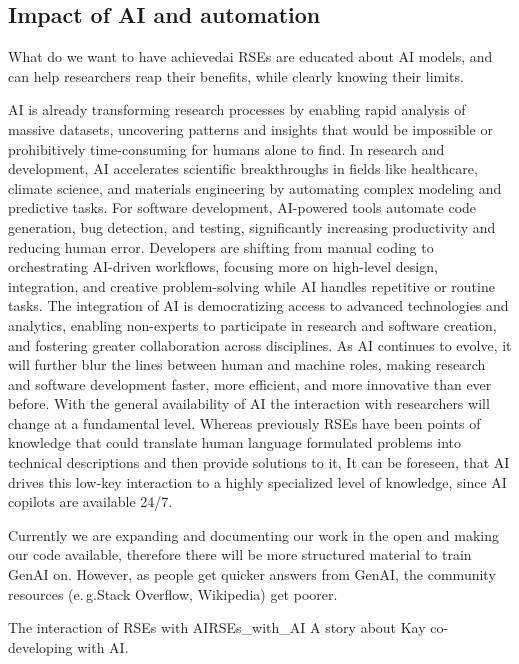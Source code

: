 \documentclass{eceasst}
\newcommand{\eg}{e.\,g.}
\begin{document}
\subsection{Impact of AI and automation}
\begin{whatis}{What do we want to have achieved}{ai}
RSEs are educated about AI models, and can help researchers reap their benefits, while
clearly knowing their limits.
\end{whatis}
AI is already transforming research processes by enabling rapid analysis of massive datasets, uncovering patterns and insights that would be impossible or prohibitively time-consuming for humans alone to find.
In research and development, AI accelerates scientific breakthroughs in fields like healthcare, climate science, and materials engineering by automating complex modeling and predictive tasks.
For software development, AI-powered tools automate code generation, bug detection, and testing, significantly increasing productivity and reducing human error.
Developers are shifting from manual coding to orchestrating AI-driven workflows, focusing more on high-level design, integration, and creative problem-solving while AI handles repetitive or routine tasks.
The integration of AI is democratizing access to advanced technologies and analytics, enabling non-experts to participate in research and software creation, and fostering greater collaboration across disciplines.
As AI continues to evolve, it will further blur the lines between human and machine roles, making research and software development faster, more efficient, and more innovative than ever before.
With the general availability of AI the interaction with researchers will change at a fundamental level.
Whereas previously RSEs have been points of knowledge that could translate human language formulated problems into technical descriptions and then provide solutions to it,
It can be foreseen, that AI drives this low-key interaction to a highly specialized level of knowledge,
since AI copilots are available 24/7.

Currently we are expanding and documenting our work in the open and making our code available,
therefore there will be more structured material to train GenAI on.
However, as people get quicker answers from GenAI, the community resources (\eg Stack Overflow, Wikipedia)
get poorer.

\begin{story}{The interaction of RSEs with AI}{RSEs_with_AI}
A story about Kay co-developing with AI.
\end{story}
\end{document}
